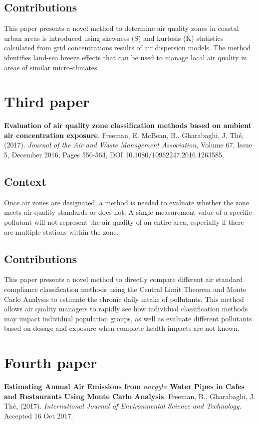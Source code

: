 \subsection{Contributions}
This paper presents a novel method to determine air quality zones in coastal urban areas is introduced using skewness (S) and kurtosis (K) statistics calculated from grid concentrations results of air dispersion models.  The method identifies land-sea breeze effects that can be used to manage local air quality in areas of similar micro-climates.

\section{Third paper}

\textbf{Evaluation of air quality zone classification methods based on ambient air concentration exposure}. Freeman, E. McBean, B., Gharabaghi, J.  Th\'e, (2017). \textit{Journal of the Air and Waste Management Association}, Volume 67, Issue 5, December 2016, Pages 550-564, DOI 10.1080/10962247.2016.1263585.
\subsection{Context}
Once air zones are designated, a method is needed to evaluate whether the zone meets air quality standards or does not. A single measurement value of a specific pollutant will not represent the air quality of an entire area, especially if there are multiple stations within the zone. 
\subsection{Contributions}
This paper presents a novel method to directly compare different air standard compliance classification methods using the Central Limit Theorem and Monte Carlo Analysis to estimate the chronic daily intake of pollutants. This method allows air quality managers to rapidly see how individual classification methods may impact individual population groups, as well as evaluate different pollutants based on dosage and exposure when complete health impacts are not known.

\section{Fourth paper}

\textbf{Estimating Annual Air Emissions from $nargyla$ Water Pipes in Cafes and Restaurants Using Monte Carlo Analysis}. Freeman, B., Gharabaghi, J.  Th\'e, (2017). \textit{International Journal of Environmental Science and Technology}. Accepted 16 Oct 2017.
